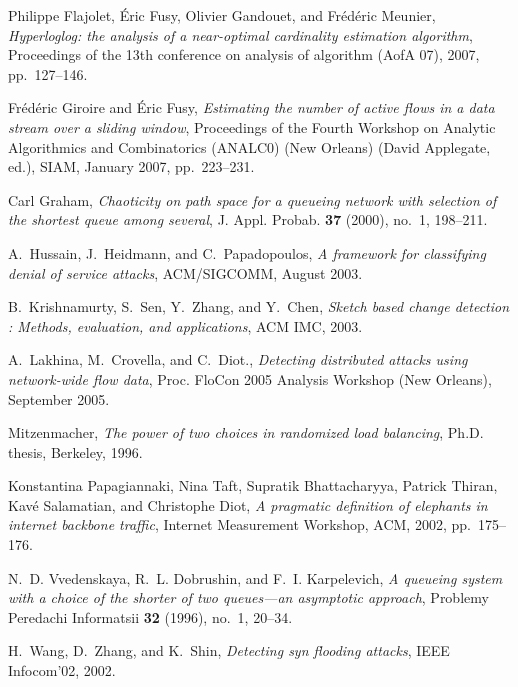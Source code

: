 \documentclass{amsart}
\begin{document}
\begin{thebibliography}{10}
Philippe Flajolet, \'Eric Fusy, Olivier Gandouet, and Fr\'ed\'eric Meunier,
  \emph{Hyperloglog: the analysis of a near-optimal cardinality estimation
  algorithm}, Proceedings of the 13th conference on analysis of algorithm (AofA
  07), 2007, pp.~127--146.

Fr\'ed\'eric Giroire and \'Eric Fusy, \emph{Estimating the number of active
  flows in a data stream over a sliding window}, Proceedings of the Fourth
  Workshop on Analytic Algorithmics and Combinatorics (ANALC0) (New Orleans)
  (David Applegate, ed.), SIAM, January 2007, pp.~223--231.

Carl Graham, \emph{Chaoticity on path space for a queueing network with
  selection of the shortest queue among several}, J. Appl. Probab. \textbf{37}
  (2000), no.~1, 198--211. 

A.~Hussain, J.~Heidmann, and C.~Papadopoulos, \emph{A framework for classifying
  denial of service attacks}, ACM/SIGCOMM, August 2003.

B.~Krishnamurty, S.~Sen, Y.~Zhang, and Y.~Chen, \emph{Sketch based change
  detection : Methods, evaluation, and applications}, ACM IMC, 2003.

A.~Lakhina, M.~Crovella, and C.~Diot., \emph{Detecting distributed attacks
  using network-wide flow data}, Proc. FloCon 2005 Analysis Workshop (New
  Orleans), September 2005.

Mitzenmacher, \emph{The power of two choices in randomized load balancing},
  Ph.D. thesis, Berkeley, 1996.

Konstantina Papagiannaki, Nina Taft, Supratik Bhattacharyya, Patrick Thiran,
  Kav{\'e} Salamatian, and Christophe Diot, \emph{A pragmatic definition of
  elephants in internet backbone traffic}, Internet Measurement Workshop, ACM,
  2002, pp.~175--176.

N.~D. Vvedenskaya, R.~L. Dobrushin, and F.~I. Karpelevich, \emph{A queueing
  system with a choice of the shorter of two queues---an asymptotic approach},
  Problemy Peredachi Informatsii \textbf{32} (1996), no.~1, 20--34.

H.~Wang, D.~Zhang, and K.~Shin, \emph{Detecting syn flooding attacks}, IEEE
  Infocom'02, 2002.

\end{thebibliography}
\end{document}
